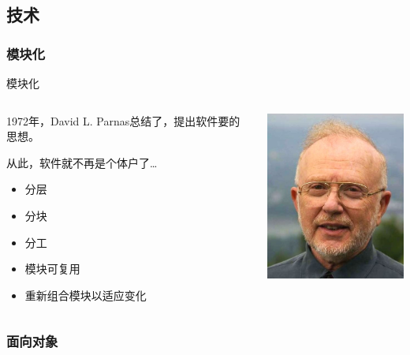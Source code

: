 \documentclass[]{beamer}
\begin{document}
\subsection{技术}

\subsubsection{模块化}

\begin{frame}{模块化}
  \begin{columns}
    \begin{column}{.5\textwidth}
      \begin{block}{}
        1972年，David L. Parnas总结了，提出软件要的思想。
      \end{block}
      \pause
      \begin{block}{从此，软件就不再是个体户了\dots}
        \begin{itemize}
          \item 分层
          \item 分块
          \item 分工
          \item 模块可复用
          \item 重新组合模块以适应变化
        \end{itemize}
      \end{block}
    \end{column}
    \begin{column}{.5\textwidth}
      \includegraphics[width=5cm]{parnas.jpg}
    \end{column}
  \end{columns}
\end{frame}

\subsubsection{面向对象}
\end{document}
